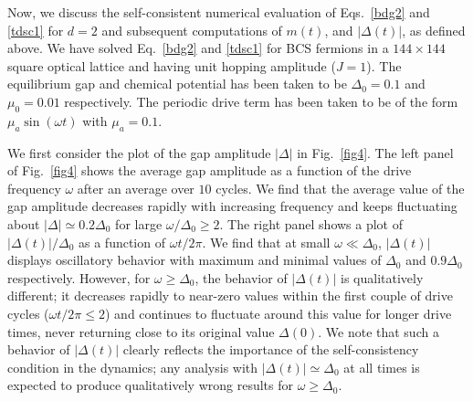 \documentclass[a4paper,10pt]{report}
\begin{document}
Now, we discuss the self-consistent numerical evaluation of Eqs.\ \ref{bdg2} and \ref{tdsc1} for $d=2$ and subsequent
computations of $m(t)$, and $|\Delta(t)|$, as
defined above. We have solved Eq.\ \ref{bdg2} and
\ref{tdsc1} for BCS fermions in a $144\times144$ square optical
lattice and having  unit hopping amplitude ($J=1$). The equilibrium
gap and chemical potential has been taken to be $\Delta_0=0.1$ and
$\mu_0=0.01$ respectively. The periodic drive term has been taken to
be of the form $\mu_a \sin(\omega t)$ with $\mu_a=0.1$.

We first consider the plot of the gap amplitude $|\Delta|$ in Fig.\
\ref{fig4}. The left panel of Fig.\ \ref{fig4} shows the average gap
amplitude as a function of the drive frequency $\omega$ after an
average over $10$ cycles. We find that the average value of the gap
amplitude decreases rapidly with increasing frequency and keeps
fluctuating about $|\Delta| \simeq 0.2 \Delta_0$ for large
$\omega/\Delta_0 \ge 2$. The right panel shows a plot of
$|\Delta(t)|/\Delta_0$ as a function of $\omega t/2\pi$. We find
that at small $\omega \ll \Delta_0$, $|\Delta(t)|$ displays
oscillatory behavior with maximum and minimal values of $\Delta_0$
and $0.9 \Delta_0$ respectively. However, for $\omega \ge \Delta_0$,
the behavior of $|\Delta(t)|$ is qualitatively different; it
decreases rapidly to near-zero values within the first couple of
drive cycles ($\omega t/2\pi \le 2$) and continues to fluctuate
around this value for longer drive times, never returning close to
its original value $\Delta(0)$. We note that such a behavior of
$|\Delta(t)|$ clearly reflects the importance of the
self-consistency condition in the dynamics; any analysis with
$|\Delta(t)| \simeq \Delta_0$ at all times is expected to produce
qualitatively wrong results for $\omega \ge \Delta_0$.
\end{document}
